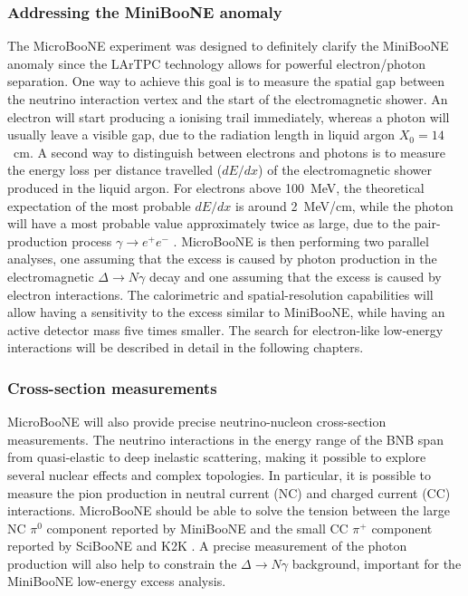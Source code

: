 \subsubsection{Addressing the MiniBooNE anomaly}
The MicroBooNE experiment was designed to definitely clarify the MiniBooNE anomaly since the LArTPC technology allows for powerful electron/photon separation. One way to achieve this goal is to measure the spatial gap between the neutrino interaction vertex and the start of the electromagnetic shower. An electron will start producing a ionising trail immediately, whereas a photon will usually leave a visible gap, due to the radiation length in liquid argon $X_0 = 14$~cm.
A second way to distinguish between electrons and photons is to measure the energy loss per distance travelled ($dE/dx$) of the electromagnetic shower produced in the liquid argon. For electrons above 100~MeV, the theoretical expectation of the most probable $dE/dx$ is around 2~MeV/cm, while the photon will have a most probable value approximately twice as large, due to the pair-production process $\gamma\rightarrow e^+e^-$ \cite{Acciarri:2016sli}. 
MicroBooNE is then performing two parallel analyses, one assuming that the excess is caused by photon production in the electromagnetic $\Delta\rightarrow N\gamma$ decay and one assuming that the excess is caused by electron interactions. The calorimetric and spatial-resolution capabilities will allow having a sensitivity to the excess similar to MiniBooNE, while having an active detector mass five times smaller.  The search for electron-like low-energy interactions will be described in detail in the following chapters.

\subsubsection{Cross-section measurements}
MicroBooNE will also provide precise neutrino-nucleon cross-section measurements. The neutrino interactions in the energy range of the BNB span from quasi-elastic to deep inelastic scattering, making it possible to explore several nuclear effects and complex topologies.
In particular, it is possible to measure the pion production in neutral current (NC) and charged current (CC) interactions. MicroBooNE should be able to solve the tension between the large NC $\pi^0$ component reported by MiniBooNE \cite{AguilarArevalo:2008xs} and the small CC $\pi^+$ component reported by SciBooNE \cite{Hiraide:2008eu} and K2K \cite{Tanaka:2006zm}. 
A precise measurement of the photon production will also help to constrain the $\Delta\rightarrow N\gamma$ background, important for the MiniBooNE low-energy excess analysis. 


